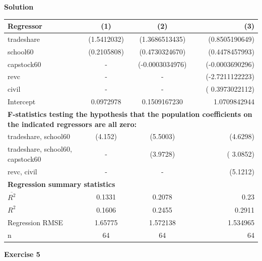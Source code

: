 \documentclass[12pt]{article}
\begin{document}
\textbf{Solution}
\medskip

\begin{tabular}{| l | c | c |r |}
  \hline
  {\bf Regressor} & {\bf (1)} & {\bf (2)} & {\bf (3)}\\ \hline
  tradeshare & (1.5412032) & (1.3686513435) & (0.8505190649)\\ \hline
  school60 & (0.2105808) & (0.4730324670) & (0.4478457993)\\ \hline
  capstock60 & - & (-0.0003034976) & (-0.0003690296)\\ \hline
  revc & - & - & (-2.7211122223)\\ \hline
  civil & - & - & ( 0.3973022112)\\ \hline
  Intercept & 0.0972978 & 0.1509167230 & 1.0709842944 \\ \hline
  
   \multicolumn{4}{|p{15cm}|}{\bf F-statistics testing the hypothesis that the population coefficients on the indicated regressors are all zero:}  \\ \hline
  tradeshare, school60 & (4.152) & (5.5003) & (4.6298)\\ \hline
  tradeshare, school60, capstock60 & - & (3.9728) & ( 3.0852)\\ \hline
  revc, civil & - & - & (5.1212)\\ \hline
  \multicolumn{4}{|l|}{\bf Regression summary statistics}  \\ \hline
  $\overline{R^2}$  & 0.1331  & 0.2078   &0.23  \\ \hline
  $R^2$ & 0.1606 & 0.2455 &0.2911 \\ \hline
  Regression RMSE & 1.65775 & 1.572138 & 1.534965\\ \hline
  n & 64  & 64  & 64 \\ \hline
\end{tabular}

\textbf{Exercise 5}
\bigskip
\end{document}
